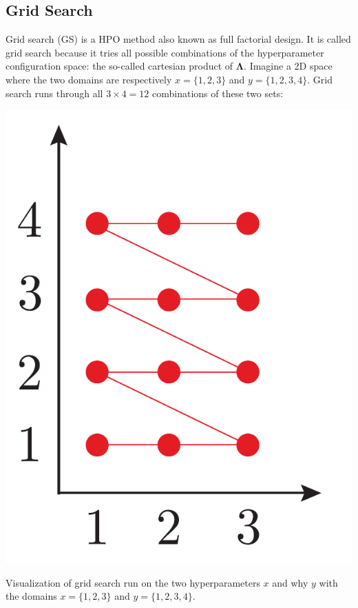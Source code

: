 \subsection{Grid Search}
\label{subsec:ml:grid_search}

Grid search (GS) is a HPO method also known as full factorial design. It is called grid search because it tries all possible combinations of the hyperparameter configuration space: the so-called cartesian product of $\bm{\Lambda}$. Imagine a 2D space where the two domains are respectively $x=\{1, 2, 3\}$ and $y=\{1, 2, 3,4\}$. Grid search runs through all $3 \times 4 = 12$ combinations of these two sets: 

\begin{marginfigure}
  \centerfloat
  \includegraphics[width=\textwidth]{figures/gridsearch/grid.pdf}
  \caption[Grid Search]{Visualization of grid search run on the two hyperparameters $x$ and why $y$ with the domains $x=\{1, 2, 3\}$ and $y=\{1, 2, 3,4\}$.}
  \label{fig:ml:gridsearch}
\end{marginfigure}

